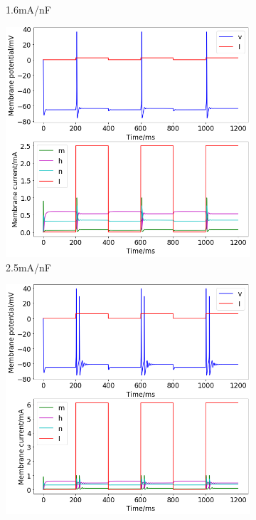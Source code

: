\documentclass[twoside,twocolumn]{article}
\begin{document}
\begin{figure}[h]
\begin{subfigure}[t]{0.49\textwidth}
  \caption{1.6mA/nF}
  \label{sub:2a1-6}
  \end{subfigure}
\newline
  \begin{subfigure}[t]{0.49\textwidth}
    \includegraphics[width=\linewidth]{a2-5}
  \caption{2.5mA/nF}
  \label{sub:2a2-5}
  \end{subfigure}
  \begin{subfigure}[t]{0.49\textwidth}
    \includegraphics[width=\linewidth]{a6-11}

\end{subfigure}
\end{figure}
\end{document}
